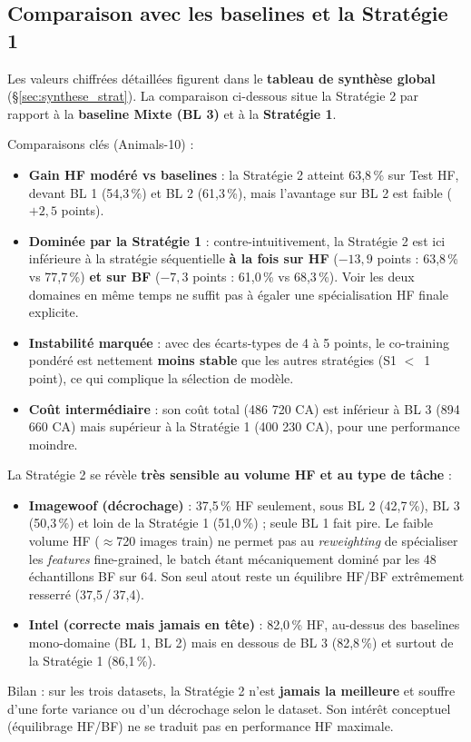 \documentclass[11pt,a4paper,openany]{book}
\begin{document}
\subsection{Comparaison avec les baselines et la Stratégie 1}

Les valeurs chiffrées détaillées figurent dans le \textbf{tableau de synthèse global} (§\ref{sec:synthese_strat}). La comparaison ci-dessous situe la Stratégie 2 par rapport à la \textbf{baseline Mixte (BL 3)} et à la \textbf{Stratégie 1}.

\vspace{0.4em}
Comparaisons clés (Animals-10) :

\begin{itemize}
  \item \textbf{Gain HF modéré vs baselines} : la Stratégie 2 atteint 63,8\,\% sur Test HF, devant BL 1 (54,3\,\%) et BL 2 (61,3\,\%), mais l'avantage sur BL 2 est faible ($+2,5$ points).
  \item \textbf{Dominée par la Stratégie 1} : contre-intuitivement, la Stratégie 2 est ici inférieure à la stratégie séquentielle \textbf{à la fois sur HF} ($-13,9$ points : 63,8\,\% vs 77,7\,\%) \textbf{et sur BF} ($-7,3$ points : 61,0\,\% vs 68,3\,\%). Voir les deux domaines en même temps ne suffit pas à égaler une spécialisation HF finale explicite.
  \item \textbf{Instabilité marquée} : avec des écarts-types de 4 à 5 points, le co-training pondéré est nettement \textbf{moins stable} que les autres stratégies (S1 $<$~1 point), ce qui complique la sélection de modèle.
  \item \textbf{Coût intermédiaire} : son coût total (486 720 CA) est inférieur à BL 3 (894 660 CA) mais supérieur à la Stratégie 1 (400 230 CA), pour une performance moindre.
\end{itemize}

\begin{hypothesebox}
  La Stratégie 2 se révèle \textbf{très sensible au volume HF et au type de tâche} :
  \begin{itemize}
    \item \textbf{Imagewoof (décrochage)} : 37,5\,\% HF seulement, sous BL 2 (42,7\,\%), BL 3 (50,3\,\%) et loin de la Stratégie 1 (51,0\,\%) ; seule BL 1 fait pire. Le faible volume HF ($\approx$720 images train) ne permet pas au \textit{reweighting} de spécialiser les \textit{features} fine-grained, le batch étant mécaniquement dominé par les 48 échantillons BF sur 64. Son seul atout reste un équilibre HF/BF extrêmement resserré (37,5\,/\,37,4).
    \item \textbf{Intel (correcte mais jamais en tête)} : 82,0\,\% HF, au-dessus des baselines mono-domaine (BL 1, BL 2) mais en dessous de BL 3 (82,8\,\%) et surtout de la Stratégie 1 (86,1\,\%).
  \end{itemize}
  Bilan : sur les trois datasets, la Stratégie 2 n'est \textbf{jamais la meilleure} et souffre d'une forte variance ou d'un décrochage selon le dataset. Son intérêt conceptuel (équilibrage HF/BF) ne se traduit pas en performance HF maximale.
\end{hypothesebox}
\end{document}
